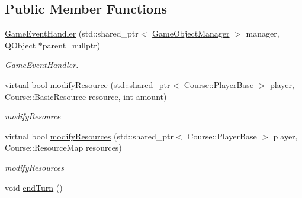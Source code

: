 \subsection*{Public Member Functions}
\begin{DoxyCompactItemize}
\item 
\hyperlink{class_game_1_1_game_event_handler_a26aed05051abfec41c863fc8073e324b}{Game\-Event\-Handler} (std\-::shared\-\_\-ptr$<$ \hyperlink{class_game_1_1_game_object_manager}{Game\-Object\-Manager} $>$ manager, Q\-Object $\ast$parent=nullptr)
\begin{DoxyCompactList}\small\item\em \hyperlink{class_game_1_1_game_event_handler}{Game\-Event\-Handler}. \end{DoxyCompactList}\item 
virtual bool \hyperlink{class_game_1_1_game_event_handler_a94426aa16bad3385bc3d75249596325c}{modify\-Resource} (std\-::shared\-\_\-ptr$<$ Course\-::\-Player\-Base $>$ player, Course\-::\-Basic\-Resource resource, int amount)
\begin{DoxyCompactList}\small\item\em modify\-Resource \end{DoxyCompactList}\item 
virtual bool \hyperlink{class_game_1_1_game_event_handler_af2f37590702d555bb6635a6a7793ebb2}{modify\-Resources} (std\-::shared\-\_\-ptr$<$ Course\-::\-Player\-Base $>$ player, Course\-::\-Resource\-Map resources)
\begin{DoxyCompactList}\small\item\em modify\-Resources \end{DoxyCompactList}\item 
\hypertarget{class_game_1_1_game_event_handler_a30de50de65075fe9e5c76ef83ff638a7}{void \hyperlink{class_game_1_1_game_event_handler_a30de50de65075fe9e5c76ef83ff638a7}{end\-Turn} ()}\label{class_game_1_1_game_event_handler_a30de50de65075fe9e5c76ef83ff638a7}


\end{DoxyCompactItemize}
